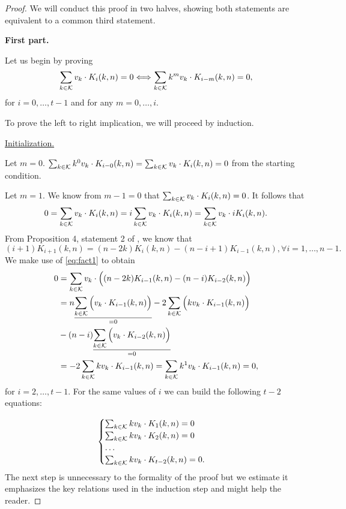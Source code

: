 \begin{proof}
    We will conduct this proof in two halves, showing both statements are equivalent to a common third statement.

    \textbf{First part.}

    Let us begin by proving
    $$\sum_{k \in \mathcal{K}} v_k \cdot K_i(k, n) = 0 \Longleftrightarrow \sum_{k \in \mathcal{K}} k^mv_k \cdot K_{i-m}(k, n) = 0,$$ for $i = 0, \ldots, t-1$ and for any $m = 0, \ldots, i$.

    To prove the left to right implication, we will proceed by induction.

    \underline{Initialization.}

    Let $m = 0$. $\sum_{k \in \mathcal{K}} k^0v_k \cdot K_{i-0}(k, n) = \sum_{k \in \mathcal{K}} v_k \cdot K_i(k, n) = 0$ from the starting condition.

    Let $m = 1$. We know from $m - 1 = 0$ that $\sum_{k \in \mathcal{K}} v_k \cdot K_i(k, n) = 0$. It follows that
    $$
    0 = \sum_{k \in \mathcal{K}} v_k \cdot K_i(k, n) = i\sum_{k \in \mathcal{K}} v_k \cdot K_i(k, n) = \sum_{k \in \mathcal{K}} v_k \cdot iK_i(k, n).
    $$
    From Proposition 4, statement 2 of \cite{DCC:DalMaiSar06}, we know that
    \begin{equation}\label{eq:fact1}
        (i+1)K_{i+1}(k, n) = (n - 2k)K_i(k,n) - (n - i + 1)K_{i-1}(k,n), \forall i = 1, \ldots, n - 1.
    \end{equation}
    We make use of \cref{eq:fact1} to obtain
    \begin{equation*}
    \begin{split}
        0 &= \sum_{k \in \mathcal{K}} v_k \cdot \Big( (n - 2k)K_{i-1}(k, n) - (n - i)K_{i-2}(k, n) \Big)\\
        & = n \underset{=0}{\underline{\sum_{k \in \mathcal{K}} \Big( v_k \cdot K_{i-1}(k, n) \Big)}} - 2\sum_{k \in \mathcal{K}} \Big( kv_k \cdot K_{i-1}(k, n) \Big)\\& - (n-i)\underset{=0}{\underline{\sum_{k \in \mathcal{K}} \Big( v_k \cdot K_{i-2}(k, n) \Big)}}\\
        &= -2\sum_{k \in \mathcal{K}} kv_k \cdot K_{i-1}(k, n) = \sum_{k \in \mathcal{K}} k^1v_k \cdot K_{i-1}(k, n) = 0,
    \end{split}
    \end{equation*}
    for $i = 2, \ldots, t-1$. For the same values of $i$ we can build the following $t-2$ equations:

    \begin{equation*}
        \begin{cases}
            \sum_{k \in \mathcal{K}} kv_k \cdot K_1(k, n) = 0\\
            \sum_{k \in \mathcal{K}} kv_k \cdot K_2(k, n) = 0\\
            \ldots\\
            \sum_{k \in \mathcal{K}} kv_k \cdot K_{t-2}(k, n) = 0.\\
        \end{cases}
    \end{equation*}
    The next step is unnecessary to the formality of the proof but we estimate it emphasizes the key relations used in the induction step and might help the reader.


\end{proof}
